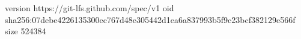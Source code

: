version https://git-lfs.github.com/spec/v1
oid sha256:07debe4226135300ec767d48e305442d1ea6a837993b5f9c23bcf382129e566f
size 524384

